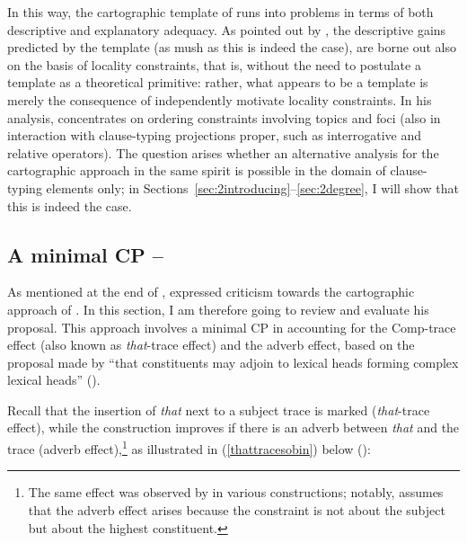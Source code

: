 In this way, the cartographic template of \citet{rizzi1997, rizzi2004} runs into problems in terms of both descriptive and explanatory adequacy. As pointed out by \citet{abels2012}, the descriptive gains predicted by the template (as mush as this is indeed the case), are borne out also on the basis of locality constraints, that is, without the need to postulate a template as a theoretical primitive: rather, what appears to be a template is merely the consequence of independently motivate locality constraints. In his analysis, \citet{abels2012} concentrates on ordering constraints involving topics and foci (also in interaction with clause-typing projections proper, such as interrogative and relative operators). The question arises whether an alternative analysis for the cartographic approach in the same spirit  is possible in the domain of clause-typing elements only; in Sections~\ref{sec:2introducing}--\ref{sec:2degree}, I will show that this is indeed the case.

\subsection{A minimal CP -- \citet{sobin2002}} \label{sec:2sobin}
As mentioned at the end of , \citet{sobin2002} expressed criticism towards the cartographic approach of \citet{rizzi1997}. In this section, I am therefore going to review and evaluate his proposal. This approach involves a minimal CP in accounting for the Comp-trace effect (also known as \textit{that}-trace effect) and the adverb effect, based on the proposal made by \citet{carnie2000} ``that constituents may adjoin to lexical heads forming complex lexical heads'' (\citealt[527]{sobin2002}).

Recall that the insertion of \textit{that} next to a subject trace is marked (\textit{that}-trace effect), while the construction improves if there is an adverb between \textit{that} and the trace (adverb effect),\footnote{The same effect was observed by \citet{bruening2010} in various constructions; notably, \citet[55]{bruening2010} assumes that the adverb effect arises because the constraint is not about the subject but about the highest constituent.} as illustrated in (\ref{thattracesobin}) below (\citealt[528, ex. 1a, 2a and 3]{sobin2002}):

\ea \label{thattracesobin}
\z
\z

